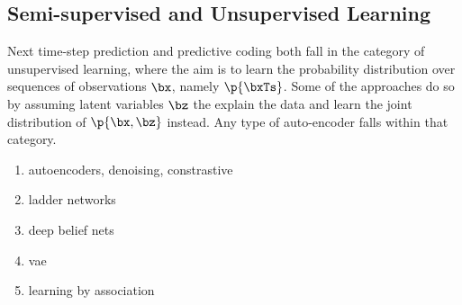 \subsection{Semi-supervised and Unsupervised Learning}

    Next time-step prediction and predictive coding both fall in the category of unsupervised learning, where the aim is to learn the probability distribution over sequences of observations $\bx$, namely $\p{\bxTs}$. Some of the approaches do so by assuming latent variables $\bz$ the explain the data and learn the joint distribution of $\p{\bx, \bz}$ instead. Any type of auto-encoder falls within that category.
    
    \begin{enumerate}
        \item autoencoders, denoising, constrastive
        \item ladder networks
        \item deep belief nets
        \item vae
        \item learning by association
    \end{enumerate}
    
    
    
    
    
    
    
    
    
    
    
    
    
    
    
    
    
    
    
